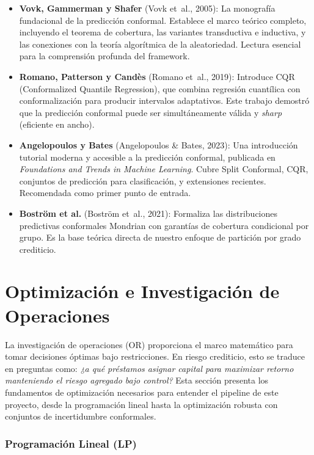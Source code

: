 \documentclass[
  spanish,
  11pt,
  letterpaper,
]{scrbook}
\theoremstyle{plain}
\theoremstyle{remark}
\begin{document}
\begin{itemize}
\item
  \textbf{Vovk, Gammerman y Shafer} (Vovk et~al., 2005): La monografía
  fundacional de la predicción conformal. Establece el marco teórico
  completo, incluyendo el teorema de cobertura, las variantes
  transductiva e inductiva, y las conexiones con la teoría algorítmica
  de la aleatoriedad. Lectura esencial para la comprensión profunda del
  framework.
\item
  \textbf{Romano, Patterson y Candès} (Romano et~al., 2019): Introduce
  CQR (Conformalized Quantile Regression), que combina regresión
  cuantílica con conformalización para producir intervalos adaptativos.
  Este trabajo demostró que la predicción conformal puede ser
  simultáneamente válida y \emph{sharp} (eficiente en ancho).
\item
  \textbf{Angelopoulos y Bates} (Angelopoulos \& Bates, 2023): Una
  introducción tutorial moderna y accesible a la predicción conformal,
  publicada en \emph{Foundations and Trends in Machine Learning}. Cubre
  Split Conformal, CQR, conjuntos de predicción para clasificación, y
  extensiones recientes. Recomendada como primer punto de entrada.
\item
  \textbf{Boström et al.} ({Boström et~al.}, 2021): Formaliza las
  distribuciones predictivas conformales Mondrian con garantías de
  cobertura condicional por grupo. Es la base teórica directa de nuestro
  enfoque de partición por grado crediticio.
\end{itemize}

\chapter{Optimización e Investigación de
Operaciones}\label{sec-optimization-or}

La investigación de operaciones (OR) proporciona el marco matemático
para tomar decisiones óptimas bajo restricciones. En riesgo crediticio,
esto se traduce en preguntas como: \emph{¿a qué préstamos asignar
capital para maximizar retorno manteniendo el riesgo agregado bajo
control?} Esta sección presenta los fundamentos de optimización
necesarios para entender el pipeline de este proyecto, desde la
programación lineal hasta la optimización robusta con conjuntos de
incertidumbre conformales.

\subsection{Programación Lineal (LP)}\label{sec-lp}
\end{document}
